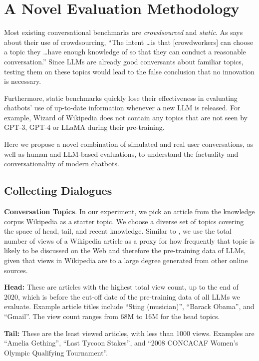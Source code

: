 \section{A Novel Evaluation Methodology}
\label{sec:evaluation}

Most existing conversational benchmarks are \emph{crowdsourced} and \emph{static}.
As \citet{komeili-etal-2022-internet} says about their use of crowdsourcing, ``The intent \ldots is that [crowdworkers] can choose a topic they \ldots have enough knowledge of so that they can conduct a reasonable conversation.'' Since LLMs are already good conversants about familiar topics, testing them on these topics would lead to the false conclusion that no innovation is necessary. 

Furthermore, static benchmarks quickly lose their effectiveness in evaluating chatbots' use of up-to-date information whenever a new LLM is released. 
For example, Wizard of Wikipedia does not contain any topics that are not seen by GPT-3, GPT-4 or LLaMA during their pre-training. 

Here we propose a novel combination of simulated and real user conversations, as well as human and LLM-based evaluations, to understand the factuality and conversationality of modern chatbots. 

\subsection{Collecting Dialogues}
{\bf Conversation Topics}.
In our experiment, we pick an article from the knowledge corpus Wikipedia as a starter topic. 
We choose a diverse set of topics covering the space of head, tail, and recent knowledge. 
Similar to \citet{mallen2022trust}, we use the total number of views of a Wikipedia article as a proxy for how frequently that topic is likely to be discussed on the Web and therefore the pre-training data of LLMs, given that views in Wikipedia are to a large degree generated from other online sources. 

{\bf Head:} These are articles with the highest total view count, up to the end of 2020, which is before the cut-off date of the pre-training data of all LLMs we evaluate.
Example article titles include “Sting (musician)”, “Barack Obama”, and “Gmail”. The view count ranges from 68M to 16M for the head topics.

{\bf Tail:} These are the least viewed articles, with less than 1000 views. Examples are “Amelia Gething”, “Last Tycoon Stakes”, and “2008 CONCACAF Women's Olympic Qualifying Tournament”.

